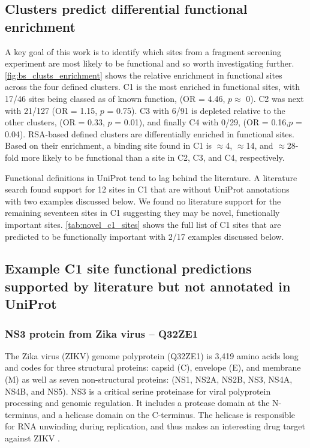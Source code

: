 \subsection{Clusters predict differential functional enrichment}

A key goal of this work is to identify which sites from a fragment screening experiment are most likely to be functional and so worth investigating further. \autoref{fig:bs_clusts_enrichment} shows the relative enrichment in functional sites across the four defined clusters. C1 is the most enriched in functional sites, with 17/46 sites being classed as of known function, (OR = 4.46, $p \approx$ 0). C2 was next with 21/127 (OR = 1.15, $p$ = 0.75). C3 with 6/91 is depleted relative to the other clusters, (OR = 0.33, $p$ = 0.01), and finally C4 with 0/29, (OR = 0.16,$p$ = 0.04). RSA-based defined clusters are differentially enriched in functional sites. Based on their enrichment, a binding site found in C1 is $\approx$4, $\approx$14, and $\approx$28-fold more likely to be functional than a site in C2, C3, and C4, respectively.

Functional definitions in UniProt tend to lag behind the literature. A literature search found support for 12 sites in C1 that are without UniProt annotations with two examples discussed below. We found no literature support for the remaining seventeen sites in C1 suggesting they may be novel, functionally important sites.  \autoref{tab:novel_c1_sites} shows the full list of C1 sites that are predicted to be functionally important with 2/17 examples discussed below.

\subsection{Example C1 site functional predictions supported by literature but not annotated in UniProt}

\subsubsection{NS3 protein from Zika virus -- Q32ZE1}

The Zika virus (ZIKV) genome polyprotein (Q32ZE1) is 3,419 amino acids long and codes for three structural proteins: capsid (C), envelope (E), and membrane (M) as well as seven non-structural proteins: (NS1, NS2A, NS2B, NS3, NS4A, NS4B, and NS5). NS3 is a critical serine proteinase for viral polyprotein processing and genomic regulation. It includes a protease domain at the N-terminus, and a helicase domain on the C-terminus. The helicase is responsible for RNA unwinding during replication, and thus makes an interesting drug target against ZIKV \cite{LUO_2015_FLAVIVIRUS}.

